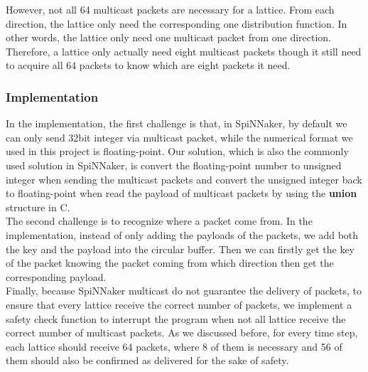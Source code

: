 However, not all 64 multicast packets are necessary for a lattice. From each direction, the lattice only need the corresponding one distribution function. In other words, the lattice only need one multicast packet from one direction. Therefore, a lattice only actually need eight multicast packets though it still need to acquire all 64 packets to know which are eight packets it need.\\

\subsubsection{Implementation}
In the implementation, the first challenge is that, in SpiNNaker, by default we can only send 32bit integer via multicast packet, while the numerical format we used in this project is floating-point. Our solution, which is also the commonly used solution in SpiNNaker, is convert the floating-point number to unsigned integer when sending the multicast packets and convert the unsigned integer back to floating-point when read the payload of multicast packets by using the \textbf{union} structure in C.\\

The second challenge is to recognize where a packet come from. In the implementation, instead of only adding the payloads of the packets, we add both the key and the payload into the circular buffer. Then we can firstly get the key of the packet knowing the packet coming from which direction then get the corresponding payload.\\

Finally, because SpiNNaker multicast do not guarantee the delivery of packets, to ensure that every lattice receive the correct number of packets, we implement a safety check function to interrupt the program when not all lattice receive the correct number of multicast packets. As we discussed before, for every time step, each lattice should receive 64 packets, where 8 of them is necessary and 56 of them should also be confirmed as delivered for the sake of safety.\\

